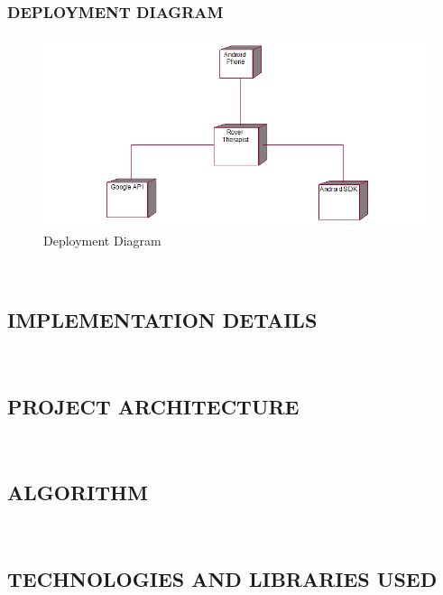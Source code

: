 \documentclass[12pt,a4paper]{article}
\begin{document}
\subsubsection{DEPLOYMENT DIAGRAM}
\begin{figure}[!htb]
\centering
\includegraphics[width=15 cm]{deployment}
\caption{Deployment Diagram}
\end{figure}
\\


\newpage
\pagestyle{plain}
\begin{center}
\section{IMPLEMENTATION DETAILS}
\end{center} 
\hspace{0.7cm}\\
\subsection{PROJECT ARCHITECTURE}
\\
\newpage
\subsection{ALGORITHM}
\\
\newpage
\subsection{TECHNOLOGIES AND LIBRARIES USED}
\\
\end{document}
